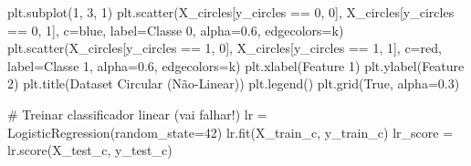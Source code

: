\documentclass[
  brazilian,
]{report}
\newenvironment{Shaded}{\begin{snugshade}}{\end{snugshade}}
\newcommand{\CommentTok}[1]{\textcolor[rgb]{0.37,0.37,0.37}{#1}}
\newcommand{\DecValTok}[1]{\textcolor[rgb]{0.68,0.00,0.00}{#1}}
\newcommand{\FloatTok}[1]{\textcolor[rgb]{0.68,0.00,0.00}{#1}}
\newcommand{\NormalTok}[1]{\textcolor[rgb]{0.00,0.23,0.31}{#1}}
\newcommand{\OperatorTok}[1]{\textcolor[rgb]{0.37,0.37,0.37}{#1}}
\newcommand{\StringTok}[1]{\textcolor[rgb]{0.13,0.47,0.30}{#1}}
\newcommand{\VariableTok}[1]{\textcolor[rgb]{0.07,0.07,0.07}{#1}}
\begin{document}
\begin{tcolorbox}
\begin{Shaded}
\begin{Highlighting}[]
\NormalTok{plt.subplot(}\DecValTok{1}\NormalTok{, }\DecValTok{3}\NormalTok{, }\DecValTok{1}\NormalTok{)}
\NormalTok{plt.scatter(X\_circles[y\_circles }\OperatorTok{==} \DecValTok{0}\NormalTok{, }\DecValTok{0}\NormalTok{], X\_circles[y\_circles }\OperatorTok{==} \DecValTok{0}\NormalTok{, }\DecValTok{1}\NormalTok{], }
\NormalTok{            c}\OperatorTok{=}\StringTok{\textquotesingle{}blue\textquotesingle{}}\NormalTok{, label}\OperatorTok{=}\StringTok{\textquotesingle{}Classe 0\textquotesingle{}}\NormalTok{, alpha}\OperatorTok{=}\FloatTok{0.6}\NormalTok{, edgecolors}\OperatorTok{=}\StringTok{\textquotesingle{}k\textquotesingle{}}\NormalTok{)}
\NormalTok{plt.scatter(X\_circles[y\_circles }\OperatorTok{==} \DecValTok{1}\NormalTok{, }\DecValTok{0}\NormalTok{], X\_circles[y\_circles }\OperatorTok{==} \DecValTok{1}\NormalTok{, }\DecValTok{1}\NormalTok{], }
\NormalTok{            c}\OperatorTok{=}\StringTok{\textquotesingle{}red\textquotesingle{}}\NormalTok{, label}\OperatorTok{=}\StringTok{\textquotesingle{}Classe 1\textquotesingle{}}\NormalTok{, alpha}\OperatorTok{=}\FloatTok{0.6}\NormalTok{, edgecolors}\OperatorTok{=}\StringTok{\textquotesingle{}k\textquotesingle{}}\NormalTok{)}
\NormalTok{plt.xlabel(}\StringTok{\textquotesingle{}Feature 1\textquotesingle{}}\NormalTok{)}
\NormalTok{plt.ylabel(}\StringTok{\textquotesingle{}Feature 2\textquotesingle{}}\NormalTok{)}
\NormalTok{plt.title(}\StringTok{\textquotesingle{}Dataset Circular (Não{-}Linear)\textquotesingle{}}\NormalTok{)}
\NormalTok{plt.legend()}
\NormalTok{plt.grid(}\VariableTok{True}\NormalTok{, alpha}\OperatorTok{=}\FloatTok{0.3}\NormalTok{)}

\CommentTok{\# Treinar classificador linear (vai falhar!)}
\NormalTok{lr }\OperatorTok{=}\NormalTok{ LogisticRegression(random\_state}\OperatorTok{=}\DecValTok{42}\NormalTok{)}
\NormalTok{lr.fit(X\_train\_c, y\_train\_c)}
\NormalTok{lr\_score }\OperatorTok{=}\NormalTok{ lr.score(X\_test\_c, y\_test\_c)}


\end{Highlighting}
\end{Shaded}
\end{tcolorbox}
\end{document}
